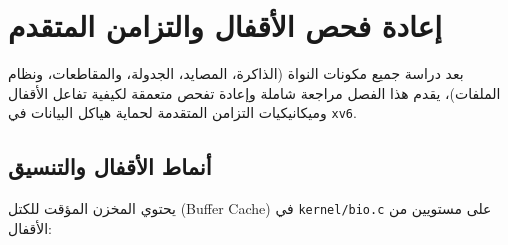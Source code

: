 \chapter{إعادة فحص الأقفال والتزامن المتقدم}
\label{CH:LOCK2}

بعد دراسة جميع مكونات النواة (الذاكرة، المصايد، الجدولة، والمقاطعات، ونظام الملفات)، يقدم هذا الفصل مراجعة شاملة وإعادة تفحص متعمقة لكيفية تفاعل الأقفال وميكانيكيات التزامن المتقدمة لحماية هياكل البيانات في \texttt{xv6}.

\section{أنماط الأقفال والتنسيق}
\label{sec:locking_patterns}

يحتوي المخزن المؤقت للكتل (Buffer Cache) في \texttt{kernel/bio.c} على مستويين من الأقفال:
